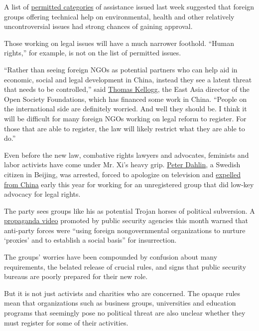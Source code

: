 A list of
\href{http://www.mps.gov.cn/n2254314/n2254409/n4904353/c5579013/content.html?from=timeline\&isappinstalled=0}{permitted
categories} of assistance issued last week suggested that foreign groups
offering technical help on environmental, health and other relatively
uncontroversial issues had strong chances of gaining approval.

Those working on legal issues will have a much narrower foothold.
``Human rights,'' for example, is not on the list of permitted issues.

``Rather than seeing foreign NGOs as potential partners who can help aid
in economic, social and legal development in China, instead they see a
latent threat that needs to be controlled,'' said
\href{https://www.opensocietyfoundations.org/people/thomas-kellogg}{Thomas
Kellogg}, the East Asia director of the Open Society Foundations, which
has financed some work in China. ``People on the international side are
definitely worried. And well they should be. I think it will be
difficult for many foreign NGOs working on legal reform to register. For
those that are able to register, the law will likely restrict what they
are able to do.''

Even before the new law, combative rights lawyers and advocates,
feminists and labor activists have come under Mr. Xi's heavy grip.
\href{http://www.nytimes.com/2016/07/10/world/asia/china-ned-ngo-peter-dahlin.html}{Peter
Dahlin}, a Swedish citizen in Beijing, was arrested, forced to apologize
on television and
\href{http://www.nytimes.com/2016/01/26/world/asia/china-to-expel-swedish-human-rights-advocate.html}{expelled
from China} early this year for working for an unregistered group that
did low-key advocacy for legal rights.

The party sees groups like his as potential Trojan horses of political
subversion. A
\href{http://www.nytimes.com/2016/12/22/world/asia/china-video-communist-party.html}{propaganda
video} promoted by public security agencies this month warned that
anti-party forces were ``using foreign nongovernmental organizations to
nurture `proxies' and to establish a social basis'' for insurrection.

The groups' worries have been compounded by confusion about many
requirements, the belated release of crucial rules, and signs that
public security bureaus are poorly prepared for their new role.

But it is not just activists and charities who are concerned. The opaque
rules mean that organizations such as business groups, universities and
education programs that seemingly pose no political threat are also
unclear whether they must register for some of their activities.

